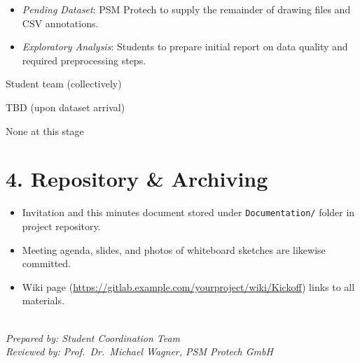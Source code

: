 \documentclass[a4paper,12pt]{article}
\begin{document}
\begin{description}[leftmargin=!,labelwidth=\widthof{\bfseries Tasks to Date:}]
  \item[Tasks:] 
    \begin{itemize}[noitemsep]
      \item \emph{Pending Dataset}: PSM Protech to supply the remainder of drawing files and CSV annotations.
      \item \emph{Exploratory Analysis}: Students to prepare initial report on data quality and required preprocessing steps.
    \end{itemize}
  \item[Responsible:] Student team (collectively)
  \item[Due:] TBD (upon dataset arrival)
  \item[Binding Notes:] None at this stage
\end{description}

\section*{4. Repository \& Archiving}
\begin{itemize}[noitemsep]
  \item Invitation and this minutes document stored under \texttt{Documentation/} folder in project repository.
  \item Meeting agenda, slides, and photos of whiteboard sketches are likewise committed.
  \item Wiki page (\url{https://gitlab.example.com/yourproject/wiki/Kickoff}) links to all materials.
\end{itemize}

\vfill
\hrulefill\\
\small
\textit{Prepared by: Student Coordination Team}\\
\textit{Reviewed by: Prof.\ Dr.\ Michael Wagner, PSM Protech GmbH}
\end{document}
